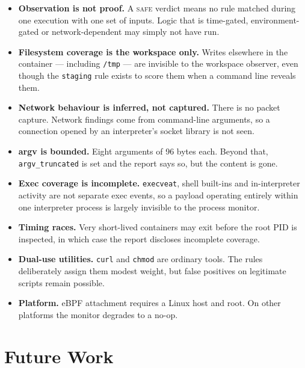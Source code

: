 \documentclass[11pt,a4paper]{article}
\newcommand{\code}[1]{\texttt{\small #1}}
\newcommand{\file}[1]{\texttt{\small #1}}
\begin{document}
\begin{itemize}[leftmargin=*]
  \item \textbf{Observation is not proof.} A \textsc{safe} verdict means no rule
        matched during one execution with one set of inputs. Logic that is
        time-gated, environment-gated or network-dependent may simply not have run.
  \item \textbf{Filesystem coverage is the workspace only.} Writes elsewhere in the
        container --- including \file{/tmp} --- are invisible to the workspace
        observer, even though the \code{staging} rule exists to score them when a
        command line reveals them.
  \item \textbf{Network behaviour is inferred, not captured.} There is no packet
        capture. Network findings come from command-line arguments, so a connection
        opened by an interpreter's socket library is not seen.
  \item \textbf{argv is bounded.} Eight arguments of 96 bytes each. Beyond that,
        \code{argv\_truncated} is set and the report says so, but the content is
        gone.
  \item \textbf{Exec coverage is incomplete.} \code{execveat}, shell built-ins and
        in-interpreter activity are not separate exec events, so a payload operating
        entirely within one interpreter process is largely invisible to the process
        monitor.
  \item \textbf{Timing races.} Very short-lived containers may exit before the root
        PID is inspected, in which case the report discloses incomplete coverage.
  \item \textbf{Dual-use utilities.} \code{curl} and \code{chmod} are ordinary
        tools. The rules deliberately assign them modest weight, but false positives
        on legitimate scripts remain possible.
  \item \textbf{Platform.} eBPF attachment requires a Linux host and root. On other
        platforms the monitor degrades to a no-op.
\end{itemize}

\section{Future Work}
\end{document}
